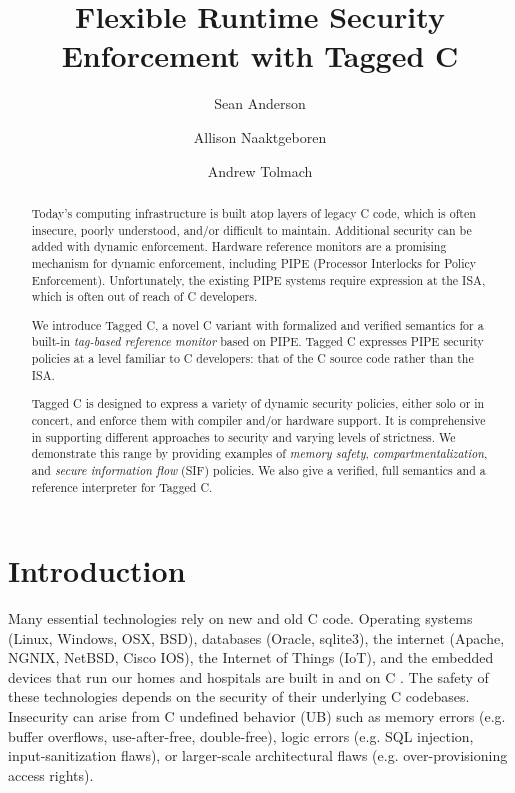 \documentclass{llncs}
\title{Flexible Runtime Security Enforcement with Tagged C}
\author{Sean Anderson \and Allison Naaktgeboren \and Andrew Tolmach}
\institute{Portland State University}
\begin{document}





\maketitle

\begin{abstract}
Today's computing infrastructure is built atop layers of legacy C code, 
which is often insecure, poorly understood, and/or difficult to maintain.
Additional security can be added with dynamic enforcement. Hardware reference monitors 
are a promising mechanism for dynamic enforcement, including PIPE (Processor
Interlocks for Policy Enforcement). Unfortunately, the existing PIPE systems
require expression at the ISA, which is often out of reach of C developers.

We introduce Tagged C, a novel C variant with formalized and verified semantics 
for a built-in {\em tag-based reference monitor} based on PIPE.
Tagged C expresses PIPE security policies at a level familiar to C developers: that
of the C source code rather than the ISA.

Tagged C is designed to express a variety of dynamic security policies,  
either solo or in concert, and enforce them with compiler and/or hardware support.
It is comprehensive in supporting different
approaches to security and varying levels of strictness. We demonstrate
this range by providing examples of {\em memory safety}, {\em compartmentalization},
and {\em secure information flow} (SIF) policies. We also give a verified, full semantics
and a reference interpreter for Tagged C.
\end{abstract}

\section{Introduction}
Many essential technologies rely on new and old C code.
Operating systems (Linux, Windows, OSX, BSD), databases (Oracle, sqlite3), the internet
(Apache, NGNIX, NetBSD, Cisco IOS), the Internet of Things (IoT), and the 
embedded devices that run our homes and hospitals are built in and on C \cite{Munoz:PoweredbyC}. 
The safety of these technologies
depends on the security of their underlying C codebases.
Insecurity can arise from C
undefined behavior (UB) such as memory errors (e.g. buffer overflows, use-after-free, double-free),
logic errors (e.g. SQL injection, input-sanitization flaws), or
larger-scale architectural flaws (e.g. over-provisioning access rights).
\end{document}

